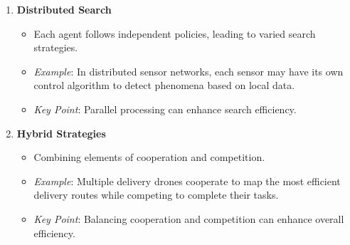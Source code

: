 \documentclass[aspectratio=169]{beamer}
\begin{document}
\begin{frame}[fragile]
\begin{enumerate}
        \item \textbf{Distributed Search}
            \begin{itemize}
                \item Each agent follows independent policies, leading to varied search strategies.
                \item \textit{Example}: In distributed sensor networks, each sensor may have its own control algorithm to detect phenomena based on local data.
                \item \textit{Key Point}: Parallel processing can enhance search efficiency.
            \end{itemize}
        
        \item \textbf{Hybrid Strategies}
            \begin{itemize}
                \item Combining elements of cooperation and competition.
                \item \textit{Example}: Multiple delivery drones cooperate to map the most efficient delivery routes while competing to complete their tasks.
                \item \textit{Key Point}: Balancing cooperation and competition can enhance overall efficiency.
            \end{itemize}
    \end{enumerate}
\end{frame}
\end{document}
